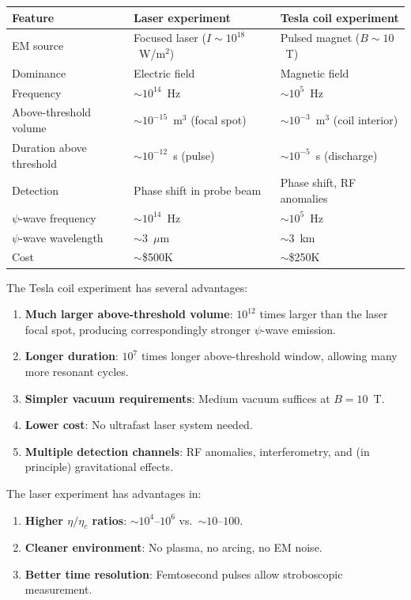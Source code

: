 \documentclass[11pt,a4paper]{article}
\begin{document}
\begin{center}
\begin{tabular}{lll}
\toprule
\textbf{Feature} & \textbf{Laser experiment} & \textbf{Tesla coil experiment} \\
\midrule
EM source & Focused laser ($I \sim 10^{18}$~W/m$^2$) & Pulsed magnet ($B \sim 10$~T) \\
Dominance & Electric field & Magnetic field \\
Frequency & $\sim 10^{14}$~Hz & $\sim 10^5$~Hz \\
Above-threshold volume & $\sim 10^{-15}$~m$^3$ (focal spot) & $\sim 10^{-3}$~m$^3$ (coil interior) \\
Duration above threshold & $\sim 10^{-12}$~s (pulse) & $\sim 10^{-5}$~s (discharge) \\
Detection & Phase shift in probe beam & Phase shift, RF anomalies \\
$\psi$-wave frequency & $\sim 10^{14}$~Hz & $\sim 10^5$~Hz \\
$\psi$-wave wavelength & $\sim 3$~$\mu$m & $\sim 3$~km \\
Cost & $\sim$\$500K & $\sim$\$250K \\
\bottomrule
\end{tabular}
\end{center}

The Tesla coil experiment has several advantages:
\begin{enumerate}
\item \textbf{Much larger above-threshold volume}: $10^{12}$ times larger than the laser
  focal spot, producing correspondingly stronger $\psi$-wave emission.
\item \textbf{Longer duration}: $10^7$ times longer above-threshold window, allowing
  many more resonant cycles.
\item \textbf{Simpler vacuum requirements}: Medium vacuum suffices at $B = 10$~T.
\item \textbf{Lower cost}: No ultrafast laser system needed.
\item \textbf{Multiple detection channels}: RF anomalies, interferometry, and
  (in principle) gravitational effects.
\end{enumerate}

The laser experiment has advantages in:
\begin{enumerate}
\item \textbf{Higher $\eta/\eta_c$ ratios}: $\sim 10^4$--$10^6$ vs.\ $\sim 10$--$100$.
\item \textbf{Cleaner environment}: No plasma, no arcing, no EM noise.
\item \textbf{Better time resolution}: Femtosecond pulses allow stroboscopic measurement.
\end{enumerate}
\end{document}
